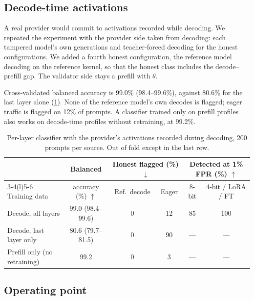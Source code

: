 \documentclass[11pt]{article}
\newcommand{\best}[1]{\cellcolor{blue!8}#1}
\newcommand{\up}{$\uparrow$}
\newcommand{\down}{$\downarrow$}
\begin{document}
\subsection{Decode-time activations}
\label{sec:res-decode}

A real provider would commit to activations recorded while decoding.
We repeated the experiment with the provider side taken from decoding: each tampered model's own generations and teacher-forced decoding for the honest configurations.
We added a fourth honest configuration, the reference model decoding on the reference kernel, so that the honest class includes the decode--prefill gap.
The validator side stays a prefill with $\theta$.

Cross-validated balanced accuracy is 99.0\% (98.4--99.6\%), against 80.6\% for the last layer alone (\cref{tab:decode}).
None of the reference model's own decodes is flagged; eager traffic is flagged on 12\% of prompts.
A classifier trained only on prefill profiles also works on decode-time profiles without retraining, at 99.2\%.

\begin{table}[!htb]
\centering
\small
\caption{Per-layer classifier with the provider's activations recorded during decoding, 200 prompts per source. Out of fold except in the last row.}
\label{tab:decode}
\begin{tabular}{@{}lccccc@{}}
\toprule
 & Balanced & \multicolumn{2}{c}{Honest flagged (\%) \down} & \multicolumn{2}{c}{Detected at 1\% FPR (\%) \up} \\
\cmidrule(lr){3-4}\cmidrule(l){5-6}
Training data & accuracy (\%) \up & Ref.\ decode & Eager & 8-bit & 4-bit / LoRA / FT \\
\midrule
Decode, all layers               & \best{99.0} {\scriptsize(98.4--99.6)} & 0 & 12 & 85 & 100 \\
Decode, last layer only          & 80.6 {\scriptsize(79.7--81.5)} & 0 & 90 & --- & --- \\
Prefill only (no retraining)     & 99.2 & 0 & 3 & --- & --- \\
\bottomrule
\end{tabular}
\end{table}

\subsection{Operating point}
\label{sec:res-op}
\end{document}
